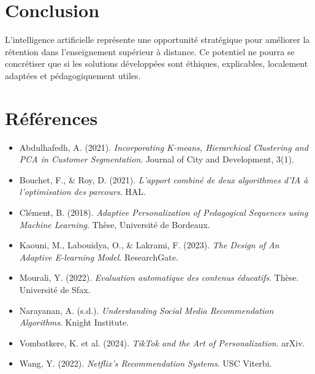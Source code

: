 \documentclass[12pt]{article}
\begin{document}
\section{Conclusion}
L’intelligence artificielle représente une opportunité stratégique pour améliorer la rétention dans l’enseignement supérieur à distance. Ce potentiel ne pourra se concrétiser que si les solutions développées sont éthiques, explicables, localement adaptées et pédagogiquement utiles.

\section*{Références}
\begin{itemize}
  \item Abdulhafedh, A. (2021). \textit{Incorporating K-means, Hierarchical Clustering and PCA in Customer Segmentation}. Journal of City and Development, 3(1).
  \item Bouchet, F., & Roy, D. (2021). \textit{L’apport combiné de deux algorithmes d’IA à l’optimisation des parcours}. HAL.
  \item Clément, B. (2018). \textit{Adaptive Personalization of Pedagogical Sequences using Machine Learning}. Thèse, Université de Bordeaux.
  \item Kaouni, M., Labouidya, O., & Lakrami, F. (2023). \textit{The Design of An Adaptive E-learning Model}. ResearchGate.
  \item Mourali, Y. (2022). \textit{Evaluation automatique des contenus éducatifs}. Thèse. Université de Sfax.
  \item Narayanan, A. (s.d.). \textit{Understanding Social Media Recommendation Algorithms}. Knight Institute.
  \item Vombatkere, K. et al. (2024). \textit{TikTok and the Art of Personalization}. arXiv.
  \item Wang, Y. (2022). \textit{Netflix’s Recommendation Systems}. USC Viterbi.
\end{itemize}
\end{document}
